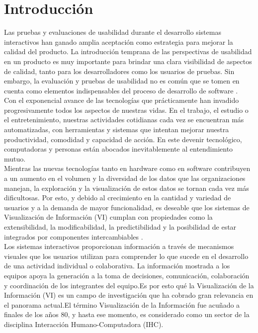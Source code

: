 \chapter{Introducción}\label{cap.introduccion}
Las pruebas y evaluaciones de usabilidad durante el desarrollo sistemas interactivos han ganado amplia aceptación como estrategia para mejorar la calidad del producto. La introducción temprana de las perspectivas de usabilidad en un producto es muy importante para brindar una clara visibilidad de aspectos de calidad, tanto para los desarrolladores como los usuarios de pruebas. Sin embargo, la evaluación y pruebas de usabilidad no es común que se tomen en cuenta como elementos indispensables del proceso de desarrollo de software\cite{florian2013propuesta} .\\
Con el exponencial avance de las tecnologías que prácticamente han invadido progresivamente todos los aspectos de nuestras vidas. En el trabajo, el estudio o el entretenimiento, nuestras actividades cotidianas cada vez se encuentran más automatizadas, con herramientas y sistemas que intentan mejorar nuestra productividad, comodidad y capacidad de acción. En este devenir tecnológico, computadoras y personas están abocados inevitablemente al entendimiento mutuo.\\
Mientras las nuevas tecnologías tanto en hardware como en software contribuyen a un aumento en el volumen y la diversidad de los datos que las organizaciones manejan, la exploración y la visualización de estos datos se tornan cada vez más dificultosas. Por esto, y debido al crecimiento en la cantidad y variedad de usuarios y a la demanda de mayor funcionalidad, es deseable que los sistemas de Visualización de Información (VI) cumplan con propiedades como la extensibilidad, la modificabilidad, la predictibilidad y la posibilidad de estar integrados por componentes intercambiables \cite{martig2003modelo}. \\
Los sistemas interactivos proporcionan información a través de mecanismos visuales que los usuarios utilizan para comprender lo que sucede en el desarrollo de una actividad individual o colaborativa. La información mostrada a los equipos apoya la generación a la toma de decisiones, comunicación, colaboración y coordinación de los integrantes del equipo\cite{garcia2018factores}.Es por esto qué la Visualización de la Información (VI) es un campo de investigación que ha cobrado gran relevancia en el panorama actual.El término Visualización de la Información fue acuñado a finales de los años 80, y hasta ese momento, es considerado como un sector de la disciplina Interacción Humano-Computadora (IHC).\\
